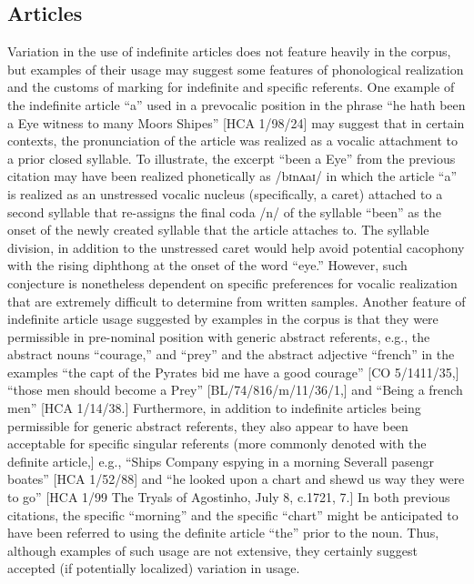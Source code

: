 \subsection{\textbf{Articles}}%

  Variation in the use of indefinite articles does not feature heavily in the corpus, but examples of their usage may suggest some features of phonological realization and the customs of marking for indefinite and specific referents. One example of the indefinite article “a” used in a prevocalic position in the phrase “he hath been a Eye witness to many Moors Shipes” [HCA 1/98/24] may suggest that in certain contexts, the pronunciation of the article was realized as a vocalic attachment to a prior closed syllable. To illustrate, the excerpt “been a Eye” from the previous citation may have been realized phonetically as /b{ɪ}nʌ{aɪ/ in which the article “a” is realized as an unstressed vocalic nucleus (specifically, a caret) attached to a second syllable that re-assigns the final coda /n/ of the syllable “been” as the onset of the newly created syllable that the article attaches to. The syllable division, in addition to the unstressed caret would help avoid potential cacophony with the rising diphthong at the onset of the word “eye.” However, such conjecture is nonetheless dependent on specific preferences for vocalic realization that are extremely difficult to determine from written samples. Another feature of indefinite article usage suggested by examples in the corpus is that they were permissible in pre-nominal position with generic abstract referents, e.g., the abstract nouns “courage,” and “prey” and the abstract adjective “french” in the examples} “the capt of the Pyrates bid me have a good courage” [CO 5/1411/35,] “those men should become a Prey” [BL/74/816/m/11/36/1,] and “Being a french men” [HCA 1/14/38.] Furthermore, in addition to indefinite articles being {permissible for generic abstract referents, they also appear to have been acceptable for specific singular referents (more commonly denoted with the definite article,] e.g.,} “Ships Company espying in a morning Severall pasengr boates” [HCA 1/52/88] and “he looked upon a chart and shewd us way they were to go” [HCA 1/99 The Tryals of Agostinho, July 8, c.1721, 7.] In both previous citations, the specific “morning” and the specific “chart” might be anticipated to have been referred to using the definite article “the” prior to the noun. Thus, although examples of such usage are not extensive, they certainly suggest accepted (if potentially localized) variation in usage. 

